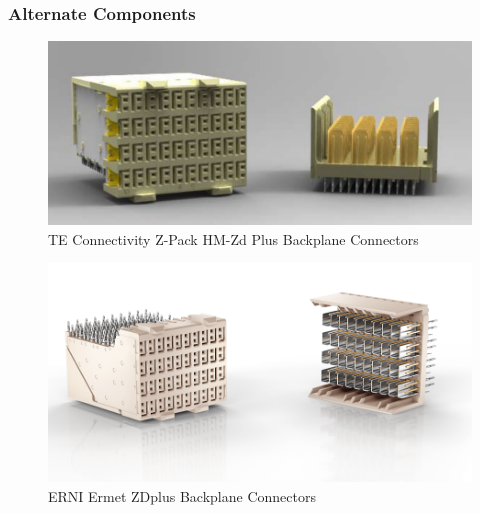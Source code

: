 \subsubsection{Alternate Components}
\- \indent
	

\begin{figure}[H]
	\center
	\setlength{\unitlength}{\textwidth} 
	\includegraphics[width=1.0\unitlength]{zpack}
	\caption{\label{fig:tvac-cycle}TE Connectivity Z-Pack HM-Zd Plus Backplane Connectors \cite{teconnec}}
\end{figure}





\begin{figure}[H]
	\center
	\setlength{\unitlength}{\textwidth} 
	\includegraphics[width=1.0\unitlength]{ermetzd2}
	\caption{\label{fig:ermetzd} ERNI Ermet ZDplus Backplane Connectors \cite{ermetzd} }
\end{figure}



